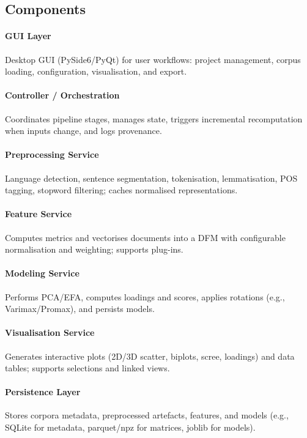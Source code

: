 \subsection{Components}
\paragraph{GUI Layer}
Desktop GUI (PySide6/PyQt) for user workflows: project management, corpus loading, configuration, visualisation, and export.

\paragraph{Controller / Orchestration}
Coordinates pipeline stages, manages state, triggers incremental recomputation when inputs change, and logs provenance.

\paragraph{Preprocessing Service}
Language detection, sentence segmentation, tokenisation, lemmatisation, POS tagging, stopword filtering; caches normalised representations.

\paragraph{Feature Service}
Computes metrics and vectorises documents into a DFM with configurable normalisation and weighting; supports plug-ins.

\paragraph{Modeling Service}
Performs PCA/EFA, computes loadings and scores, applies rotations (e.g., Varimax/Promax), and persists models.

\paragraph{Visualisation Service}
Generates interactive plots (2D/3D scatter, biplots, scree, loadings) and data tables; supports selections and linked views.

\paragraph{Persistence Layer}
Stores corpora metadata, preprocessed artefacts, features, and models (e.g., SQLite for metadata, parquet/npz for matrices, joblib for models).

